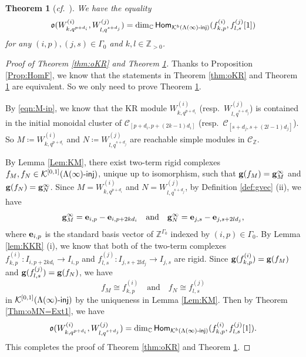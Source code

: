 \documentclass[12pt]{amsart}
\newtheorem{theorem}{Theorem}[section]
\theoremstyle{definition}
\theoremstyle{remark}
\numberwithin{equation}{section}
\newcommand{\opname}[1]{\operatorname{\mathsf{#1}}}
\newcommand{\Hom}{\opname{Hom}}
\newcommand{\confer}{\textit{cf.}\ }
\newcommand{\injc}{\mathchar`-\mathsf{inj}}
\begin{document}
\begin{theorem}[{\confer \cite[Conjecture 5.17]{FM}}] \label{thm:oKR2}
We have the equality
\begin{equation} \label{eq:oKR2} 
\mathfrak{o}(W^{(i)}_{k,q^{p+d_i}}, W^{(j)}_{l,q^{s+d_j}}) = \dim_{\mathbb{C}} \Hom_{\mathcal{K}^b(\Lambda(\infty)\injc)}(f^{(i)}_{k,p}, f^{(j)}_{l,s}[1]) 
\end{equation} 
for any $(i,p), (j,s) \in \Gamma_0$ and $k,l \in \mathbb{Z}_{>0}$.
\end{theorem}
\begin{proof}[Proof of Theorem \ref{thm:oKR} and 
Theorem \ref{thm:oKR2}]
Thanks to Proposition \ref{Prop:HomF}, we know that the statements in Theorem 
\ref{thm:oKR} and Theorem \ref{thm:oKR2} are equivalent. So we only need to prove Theorem \ref{thm:oKR2}. 




By \eqref{eqn:M-ip}, we know that the KR module $W^{(i)}_{k,q^{p+d_i}}$ (resp.\ $W^{(j)}_{l,q^{s+d_j}}$)
is contained in the initial monoidal cluster of $\mathcal C_{[p+d_i,p+(2k-1)d_i]}$ (resp.\ $\mathcal C_{[s+d_j,s+(2l-1)d_j]}$). So $M\coloneq W^{(i)}_{k,q^{p+d_i}}$ and $N\coloneq W^{(j)}_{l,q^{s+d_j}}$ are reachable simple modules in $\mathcal C_{\mathbb Z}$. 


By Lemma \ref{Lem:KM}, there exist two-term rigid complexes $f_M, f_N\in \mathcal{K}^{[0,1]}(\Lambda(\infty)\injc)$, unique up to isomorphism, such that ${\bf g}(f_M)={\bf g}^\infty_M$ and ${\bf g}(f_N)={\bf g}^\infty_N$. Since
$M=W^{(i)}_{k,q^{p+d_i}}$ and $N=W^{(j)}_{l,q^{s+d_j}}$, by Definition \ref{def:gvec} (ii), we have
\[{\bf g}^\infty_M={\bf e}_{i,p}-{\bf e}_{i,p+2kd_i}\quad\text{and}\quad {\bf g}^\infty_N={\bf e}_{j,s}-{\bf e}_{j,s+2ld_j},
\]
where ${\bf e}_{i,p}$ is the standard basis vector of $\mathbb Z^{\Gamma_0}$ indexed by $(i,p)\in \Gamma_0$. By Lemma \ref{lem:KKR} (i), we know that both of the two-term complexes $f_{k,p}^{(i)}\colon I_{i,p+2kd_i}\to I_{i,p}$ and $f_{l,s}^{(j)}\colon I_{j,s+2ld_j}\to I_{j,s}$ are rigid. Since ${\bf g}(f_{k,p}^{(i)})={\bf g}(f_M)$ and ${\bf g}(f_{l,s}^{(j)})={\bf g}(f_N)$, we have 
\[
f_M\cong f_{k,p}^{(i)}\quad \text{and}\quad f_N\cong f_{l,s}^{(j)}
\] in $\mathcal{K}^{[0,1]}(\Lambda(\infty)\injc)$ by the uniqueness in Lemma \ref{Lem:KM}. Then by Theorem \ref{Thm:oMN=Ext1}, we have \[\mathfrak{o}(W^{(i)}_{k,q^{p+d_i}}, W^{(j)}_{l,q^{s+d_j}}) = \dim_{\mathbb{C}} \Hom_{\mathcal{K}^b(\Lambda(\infty)\injc)}(f^{(i)}_{k,p}, f^{(j)}_{l,s}[1]).\] This completes the proof of Theorem \ref{thm:oKR} and 
Theorem \ref{thm:oKR2}.
\end{proof}
\end{document}
